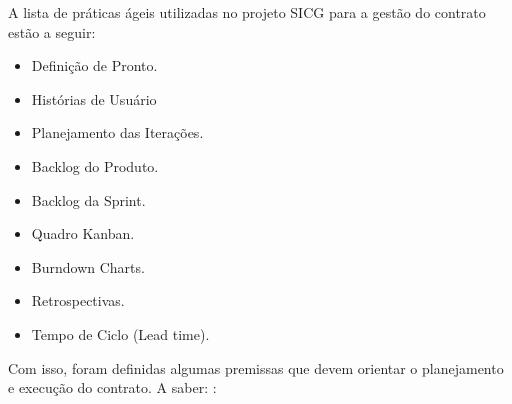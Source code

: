 A lista de práticas ágeis utilizadas no projeto SICG para a gestão do contrato estão a seguir:
\begin{itemize}
\item Definição de Pronto.
\item Histórias de Usuário
\item Planejamento das Iterações.
\item Backlog do Produto.
\item Backlog da Sprint.
\item Quadro Kanban.
\item Burndown Charts.
\item Retrospectivas.
\item Tempo de Ciclo (Lead time).
\end{itemize}

Com isso, foram definidas algumas premissas que devem orientar o planejamento e execução do contrato. A saber:  \cite{parente}:
